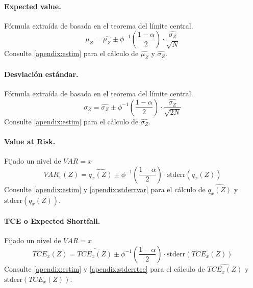 \paragraph{Expected value.} F\'ormula extra\'ida de \cite{stats:schaum} basada en el
teorema del l\'imite central.
\begin{displaymath}
\mu_Z = \widehat{\mu_Z} \pm \phi^{-1}\left(\frac{1-\alpha}{2}\right) \cdot \frac{\widehat{\sigma_Z}}{\sqrt{N}}
\end{displaymath}
Consulte \ref{apendix:estim} para el c\'alculo de $\widehat{\mu_Z}$ y $\widehat{\sigma_Z}$.

\paragraph{Desviaci\'on est\'andar.} F\'ormula extra\'ida de \cite{stats:schaum} basada en el
teorema del l\'imite central.
\begin{displaymath}
\sigma_Z = \widehat{\sigma_Z} \pm \phi^{-1}\left(\frac{1-\alpha}{2}\right) \cdot \frac{\widehat{\sigma_Z}}{\sqrt{2N}}
\end{displaymath}
Consulte \ref{apendix:estim} para el c\'alculo de $\widehat{\sigma_Z}$.

\paragraph{Value at Risk.} Fijado un nivel de $VAR = x$
\begin{displaymath}
VAR_{x}(Z) = \widehat{q_{x}(Z)} \pm \phi^{-1}\left(\frac{1-\alpha}{2}\right) \cdot \textrm{stderr}(q_{x}(Z))
\end{displaymath}
Consulte \ref{apendix:estim} y \ref{apendix:stderrvar} para el c\'alculo de
$\widehat{q_{x}(Z)}$ y $\textrm{stderr}(q_{x}(Z))$.

\paragraph{TCE o Expected Shortfall.} Fijado un nivel de $VAR = x$
\begin{displaymath}
TCE_{x}(Z) = \widehat{TCE_{x}(Z)} \pm \phi^{-1}\left(\frac{1-\alpha}{2}\right) \cdot \textrm{stderr}(TCE_{x}(Z))
\end{displaymath}
Consulte \ref{apendix:estim} y \ref{apendix:stderrtce} para el c\'alculo de
$\widehat{TCE_{x}(Z)}$ y $\textrm{stderr}(TCE_{x}(Z))$.